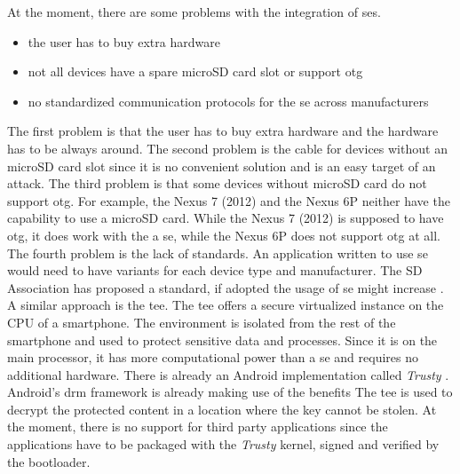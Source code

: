 At the moment, there are some problems with the integration of \gls{se}s.
\begin{itemize}
  \item the user has to buy extra hardware
  \item not all devices have a spare microSD card slot or support \gls{otg}
  \item no standardized communication protocols for the \gls{se} across manufacturers
\end{itemize}
The first problem is that the user has to buy extra hardware and the hardware has to be always around.
The second problem is the cable for devices without an microSD card slot since it is no convenient solution and is an easy target of an attack.
\newline
The third problem is that some devices without microSD card do not support \gls{otg}.
For example, the Nexus 7 (2012) and the Nexus 6P neither have the capability to use a microSD card.
While the Nexus 7 (2012) is supposed to have \gls{otg}, it does work with the a \gls{se}, while the Nexus 6P does not support \gls{otg} at all.
\newline
The fourth problem is the lack of standards.
An application written to use \gls{se} would need to have variants for each device type and manufacturer.
The SD Association has proposed a standard, if adopted the usage of \gls{se} might increase \cite{smartSD}.
\newline
\newline
A similar approach is the \gls{tee}.
The \gls{tee} offers a secure virtualized instance on the CPU of a smartphone.
The environment is isolated from the rest of the smartphone and used to protect sensitive data and processes.
Since it is on the main processor, it has more computational power than a \gls{se} and requires no additional hardware.
There is already an Android implementation called \textit{Trusty} \cite{trusty}.
Android’s \gls{drm} framework is already making use of the benefits
The \gls{tee} is used to decrypt the protected content in a location where the key cannot be stolen.
At the moment, there is no support for third party applications since the applications have to be packaged with the \textit{Trusty} kernel, signed and verified by the bootloader. \cite{trusty} \cite{teeGlobal}
